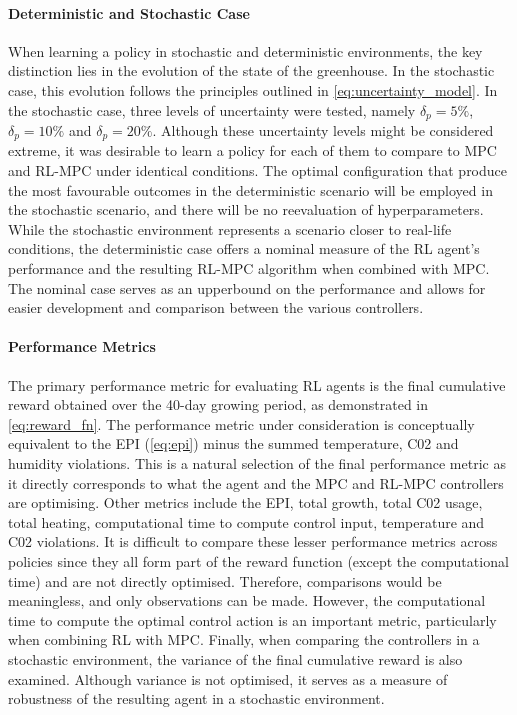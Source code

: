 \paragraph{Deterministic and Stochastic Case}
When learning a policy in stochastic and deterministic environments, the key distinction lies in the evolution of the state of the greenhouse. In the stochastic case, this evolution follows the principles outlined in \autoref{eq:uncertainty_model}. In the stochastic case, three levels of uncertainty were tested, namely $\delta_p = 5\%$,$\delta_p = 10\%$ and $\delta_p = 20\%$. Although these uncertainty levels might be considered extreme, it was desirable to learn a policy for each of them to compare to MPC and RL-MPC under identical conditions. The optimal configuration that produce the most favourable outcomes in the deterministic scenario will be employed in the stochastic scenario, and there will be no reevaluation of hyperparameters. While the stochastic environment represents a scenario closer to real-life conditions, the deterministic case offers a nominal measure of the RL agent’s performance and the resulting RL-MPC algorithm when combined with MPC. The nominal case serves as an upperbound on the performance and allows for easier development and comparison between the various controllers.

\paragraph{Performance Metrics}
The primary performance metric for evaluating RL agents is the final cumulative reward obtained over the 40-day growing period, as demonstrated in \autoref{eq:reward_fn}. The performance metric under consideration is conceptually equivalent to the EPI (\autoref{eq:epi}) minus the summed temperature, C02 and humidity violations. This is a natural selection of the final performance metric as it directly corresponds to what the agent and the MPC and RL-MPC controllers are optimising. Other metrics include the EPI, total growth, total C02 usage, total heating, computational time to compute control input, temperature and C02 violations. It is difficult to compare these lesser performance metrics across policies since they all form part of the reward function (except the computational time) and are not directly optimised. Therefore, comparisons would be meaningless, and only observations can be made. However, the computational time to compute the optimal control action is an important metric, particularly when combining RL with MPC. Finally, when comparing the controllers in a stochastic environment, the variance of the final cumulative reward is also examined. Although variance is not optimised, it serves as a measure of robustness of the resulting agent in a stochastic environment.

